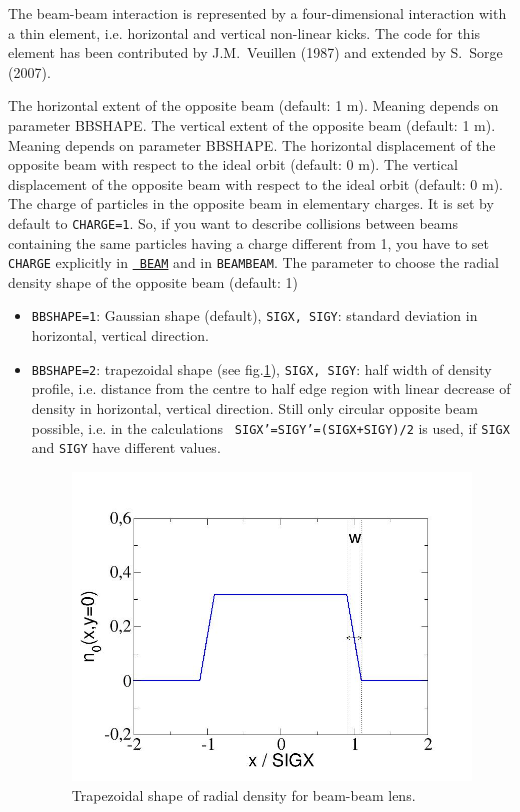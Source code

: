 {The beam-beam interaction is represented by a four-dimensional
interaction with a thin element, i.e. horizontal and vertical non-linear kicks.
The code for this element has been contributed by J.M.~Veuillen (1987)
and extended by S.~Sorge (2007).  
 
\begin{madlist}
     The horizontal extent of the opposite beam (default: 1 m).
     Meaning depends on parameter BBSHAPE.
     The vertical extent of the opposite beam (default: 1 m).
     Meaning depends on parameter BBSHAPE.
     The horizontal displacement of the opposite beam with respect to
     the ideal orbit (default: 0 m).
     The vertical displacement of the opposite beam with respect to
     the ideal orbit (default: 0 m).
     The charge of particles in the opposite beam in elementary charges. 
     It is set by default to {\tt CHARGE=1}. So, if you want to describe 
     collisions 
     between beams containing the same particles having a charge different 
     from 1, you have to set {\tt CHARGE} explicitly in \hyperref[sec:beam]{\tt 
     BEAM} and in {\tt BEAMBEAM}. 
    The parameter to choose the radial density shape of the 
     opposite beam (default: 1)
     \begin{itemize}
       \item  {\tt BBSHAPE=1}: Gaussian shape (default), {\tt SIGX, SIGY}: 
       standard deviation in horizontal, vertical direction.
       \item  {\tt BBSHAPE=2}: trapezoidal shape (see 
       fig.\ref{fig:beambeam_n_trapez}), {\tt SIGX, SIGY}: half width of 
       density profile, i.e. distance from the centre to half edge region with 
       linear decrease of density in horizontal, vertical direction. Still only 
       circular opposite beam possible, i.e. in the calculations {\tt 
       SIGX'=SIGY'=(SIGX+SIGY)/2} is used, if {\tt SIGX} and {\tt SIGY} have 
       different values.

\begin{figure}[h]
  \begin{center}
    \includegraphics[width=400px]{jpg/beambeam_n_trapez.jpg}
    \caption{Trapezoidal shape of radial density for beam-beam lens.} 
    \label{fig:beambeam_n_trapez}
  \end{center}
\end{figure}


\end{itemize}
\end{madlist}}
